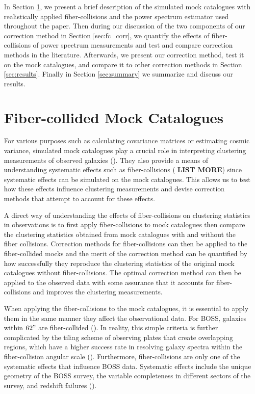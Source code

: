 \documentclass{emulateapj}
\begin{document}
In Section \ref{sec:catalog}, we present a brief description of the simulated mock catalogues with realistically applied fiber-collisions and the power spectrum estimator used throughout the paper. Then during our discussion of the two components of our correction method in Section \ref{sec:fc_corr}, we quantify the effects of fiber-collisions of power spectrum measurements and test and compare correction methods in the literature. Afterwards, we present our correction method, test it on the mock catalogues, and compare it to other correction methods in Section \ref{sec:results}. Finally in Section \ref{sec:summary} we summarize and discuss our results. 

\section{Fiber-collided Mock Catalogues} \label{sec:catalog}
For various purposes such as calculating covariance matrices or estimating cosmic variance, simulated mock catalogues play a crucial role in interpreting clustering measurements of observed galaxies (\citealt{Scoccimarro:2002aa, Anderson:2012aa, Manera:2013aa}). They also provide a means of understanding systematic effects such as fiber-collisions (\citealt{Guo:2012aa, Manera:2013aa} {\bf LIST MORE}) since systematic effects can be simulated on the mock catalogues. This allows us to test how these effects influence clustering measurements and devise correction methods that attempt to account for these effects.

A direct way of understanding the effects of fiber-collisions on clustering statistics in observations is to first apply fiber-collisions to mock catalogues then compare the clustering statistics obtained from mock catalogues with and without the fiber collisions. Correction methods for fiber-collisions can then be applied to the fiber-collided mocks and the merit of the correction method can be quantified by how successfully they reproduce the clustering statistics of the original mock catalogues without fiber-collisions. The optimal correction method can then be applied to the observed data with some assurance that it accounts for fiber-collisions and improves the clustering measurements. 

When applying the fiber-collisions to the mock catalogues, it is essential to apply them in the same manner they affect the observational data. For BOSS, galaxies within $62"$ are fiber-collided (\citealt{Anderson:2012aa}). In reality, this simple criteria is further complicated by the tiling scheme of observing plates that create overlapping regions, which have a higher success rate in resolving galaxy spectra within the fiber-collision angular scale (\citealt{Guo:2012aa}). Furthermore, fiber-collisions are only one of the systematic effects that influence BOSS data. Systematic effects include the unique geometry of the BOSS survey, the variable completeness in different sectors of the survey, and redshift failures (\citealt{Anderson:2012aa}). 
\end{document}
